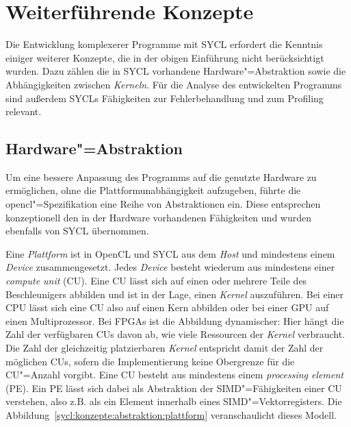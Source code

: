 \section{Weiterführende Konzepte}\label{sycl:konzepte}

Die Entwicklung komplexerer Programme mit SYCL erfordert die Kenntnis einiger
weiterer Konzepte, die in der obigen Einführung nicht berücksichtigt wurden.
Dazu zählen die in SYCL vorhandene Hardware"=Abstraktion sowie die
Abhängigkeiten zwischen \textit{Kerneln}. Für die Analyse des entwickelten
Programms sind außerdem SYCLs Fähigkeiten zur Fehlerbehandlung und zum Profiling
relevant.

\subsection{Hardware"=Abstraktion}

Um eine bessere Anpassung des Programms auf die genutzte Hardware zu
ermöglichen, ohne die Plattformunabhängigkeit aufzugeben, führte die
\gls{opencl}"=Spezifikation eine Reihe von Abstraktionen ein. Diese entsprechen
konzeptionell den in der Hardware vorhandenen Fähigkeiten und wurden ebenfalls
von SYCL übernommen.

Eine \textit{Plattform} ist in OpenCL und SYCL aus dem \textit{Host} und
mindestens einem \textit{Device} zusammengesetzt. Jedes \textit{Device} besteht
wiederum aus mindestens einer \textit{compute unit} (CU). Eine CU lässt sich auf
einen oder mehrere Teile des Beschleunigers abbilden und ist in der Lage, einen
\textit{Kernel} auszuführen. Bei einer CPU lässt sich eine CU also auf einen
Kern abbilden oder bei einer GPU auf einen Multiprozessor. Bei FPGAs ist die
Abbildung dynamischer: Hier hängt die Zahl der verfügbaren CUs davon ab, wie
viele Ressourcen der \textit{Kernel} verbraucht. Die Zahl der gleichzeitig
platzierbaren \textit{Kernel} entspricht damit der Zahl der möglichen CUs,
sofern die Implementierung keine Obergrenze für die CU"=Anzahl vorgibt. Eine CU
besteht aus mindestens einem \textit{processing element} (PE). Ein PE lässt sich
dabei als Abstraktion der SIMD"=Fähigkeiten einer CU verstehen, also z.B. als
ein Element innerhalb eines SIMD"=Vektorregisters.
Die Abbildung~\ref{sycl:konzepte:abstraktion:plattform} veranschaulicht dieses
Modell.

